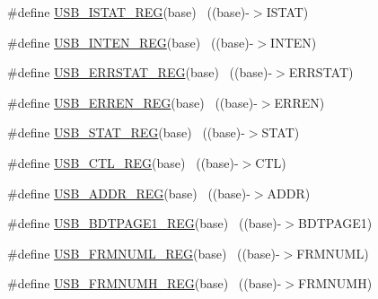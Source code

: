 \begin{DoxyCompactItemize}
\item 
\#define \hyperlink{group___u_s_b___register___accessor___macros_gab6ac8d1d423f3e1a470be14236d70a4e}{U\+S\+B\+\_\+\+I\+S\+T\+A\+T\+\_\+\+R\+EG}(base)                                        ~((base)-\/$>$I\+S\+T\+AT)
\item 
\#define \hyperlink{group___u_s_b___register___accessor___macros_ga449f9c03283cd7a1b78126211670fcf8}{U\+S\+B\+\_\+\+I\+N\+T\+E\+N\+\_\+\+R\+EG}(base)                                        ~((base)-\/$>$I\+N\+T\+EN)
\item 
\#define \hyperlink{group___u_s_b___register___accessor___macros_ga7b4d3f12786ff16600f22ef96106cb78}{U\+S\+B\+\_\+\+E\+R\+R\+S\+T\+A\+T\+\_\+\+R\+EG}(base)                                    ~((base)-\/$>$E\+R\+R\+S\+T\+AT)
\item 
\#define \hyperlink{group___u_s_b___register___accessor___macros_ga5bcc0b18083d1e8ca3df5215acd96ffd}{U\+S\+B\+\_\+\+E\+R\+R\+E\+N\+\_\+\+R\+EG}(base)                                        ~((base)-\/$>$E\+R\+R\+EN)
\item 
\#define \hyperlink{group___u_s_b___register___accessor___macros_gaeab7fa3c051021f1fc0efcb46483e7b4}{U\+S\+B\+\_\+\+S\+T\+A\+T\+\_\+\+R\+EG}(base)                                          ~((base)-\/$>$S\+T\+AT)
\item 
\#define \hyperlink{group___u_s_b___register___accessor___macros_gad64167a6ab05b5ae9dba249da9ad7af7}{U\+S\+B\+\_\+\+C\+T\+L\+\_\+\+R\+EG}(base)                                            ~((base)-\/$>$C\+TL)
\item 
\#define \hyperlink{group___u_s_b___register___accessor___macros_ga03f0a41161dca06c094577e93612fcc9}{U\+S\+B\+\_\+\+A\+D\+D\+R\+\_\+\+R\+EG}(base)                                          ~((base)-\/$>$A\+D\+DR)
\item 
\#define \hyperlink{group___u_s_b___register___accessor___macros_gaee966956afc1831775ca4985a36bef1c}{U\+S\+B\+\_\+\+B\+D\+T\+P\+A\+G\+E1\+\_\+\+R\+EG}(base)                                  ~((base)-\/$>$B\+D\+T\+P\+A\+G\+E1)
\item 
\#define \hyperlink{group___u_s_b___register___accessor___macros_ga93fd74f20933fb2aa15f86de9b46436a}{U\+S\+B\+\_\+\+F\+R\+M\+N\+U\+M\+L\+\_\+\+R\+EG}(base)                                    ~((base)-\/$>$F\+R\+M\+N\+U\+ML)
\item 
\#define \hyperlink{group___u_s_b___register___accessor___macros_ga8a4e8ec678086774fac29ef632712987}{U\+S\+B\+\_\+\+F\+R\+M\+N\+U\+M\+H\+\_\+\+R\+EG}(base)                                    ~((base)-\/$>$F\+R\+M\+N\+U\+MH)

\end{DoxyCompactItemize}
